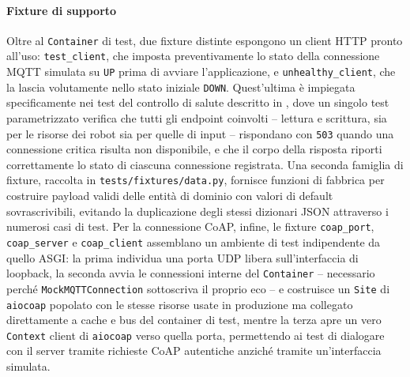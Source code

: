 \paragraph{Fixture di supporto}
Oltre al \texttt{Container} di test, due fixture distinte espongono un client \ac{HTTP} pronto all'uso: \texttt{test\_client}, che imposta preventivamente lo stato della connessione \ac{MQTT} simulata su \texttt{UP} prima di avviare l'applicazione, e \texttt{unhealthy\_client}, che la lascia volutamente nello stato iniziale \texttt{DOWN}. Quest'ultima è impiegata specificamente nei test del controllo di salute descritto in , dove un singolo test parametrizzato verifica che tutti gli endpoint coinvolti -- lettura e scrittura, sia per le risorse dei robot sia per quelle di input -- rispondano con \texttt{503} quando una connessione critica risulta non disponibile, e che il corpo della risposta riporti correttamente lo stato di ciascuna connessione registrata. Una seconda famiglia di fixture, raccolta in \texttt{tests/fixtures/data.py}, fornisce funzioni di fabbrica per costruire payload validi delle entità di dominio con valori di default sovrascrivibili, evitando la duplicazione degli stessi dizionari JSON attraverso i numerosi casi di test. Per la connessione \ac{CoAP}, infine, le fixture \texttt{coap\_port}, \texttt{coap\_server} e \texttt{coap\_client} assemblano un ambiente di test indipendente da quello \ac{ASGI}: la prima individua una porta \ac{UDP} libera sull'interfaccia di loopback, la seconda avvia le connessioni interne del \texttt{Container} -- necessario perché \texttt{MockMQTTConnection} sottoscriva il proprio eco -- e costruisce un \texttt{Site} di \texttt{aiocoap} popolato con le stesse risorse usate in produzione ma collegato direttamente a cache e bus del container di test, mentre la terza apre un vero \texttt{Context} client di \texttt{aiocoap} verso quella porta, permettendo ai test di dialogare con il server tramite richieste \ac{CoAP} autentiche anziché tramite un'interfaccia simulata.


